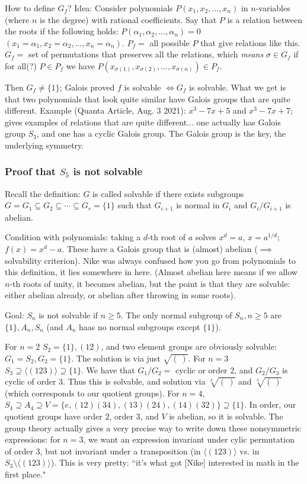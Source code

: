 \documentclass{article}
\theoremstyle{plain}
\theoremstyle{remark}
\begin{document}
How to define $G_f$?
Idea: Consider polynomials $P(x_1,x_2,\dots,x_n)$ in $n$-variables
(where $n$ is the degree) with rational coefficients.
Say that $P$ is a relation between the roots if the following holds:
$P(\alpha_1,\alpha_2,\dots,\alpha_n) = 0$ $(x_1=\alpha_1,x_2=\alpha_2,\dots,x_n=\alpha_n)$.
$P_f = $ all possible $P$ that give relations like this.
$G_f = $ set of permutations that preserves all the relations,
which \emph{means} $\sigma \in G_f$ if for all(?) $P \in P_f$ we have
$P(x_{\sigma(1)},x_{\sigma(2)},\dots,x_{\sigma(n)}) \in P_f$.

Then $G_f \neq \{1\}$; Galois proved $f$ is solvable $\iff G_f$ is solvable.
What we get is that two polynomials that look quite similar have
Galois groups that are quite different.
Example (Quanta Article, Aug. 3 2021): $x^3 - 7x + 5$ and $x^3 - 7x + 7$;
gives examples of relations that are quite different...
one actually has Galois group $S_3$, and one has a cyclic Galois group.
The Galois group is the key, the underlying symmetry.

\subsubsection{Proof that $S_5$ is not solvable}
Recall the definition: $G$ is called solvable if there exists subgroups
$G = G_1 \subseteq G_2 \subseteq \cdots \subseteq G_r = \{1\}$
such that $G_{i+1}$ is normal in $G_i$ and $G_i/G_{i+1}$ is abelian.

Condition with polynomials: taking a $d$-th root of $a$ solves $x^d = a$, $x = a^{1/d}$; $f(x) = x^d - a$.
These have a Galois group that is (almost) abelian ($\implies$ solvability criterion).
Nike was always confused how you go from polynomials to this definition,
it lies somewhere in here.
(Almost abelian here means if we allow $n$-th roots of unity, it becomes abelian,
but the point is that they are solvable:
either abelian already, or abelian after throwing in some roots).

Goal: $S_n$ is not solvable if $n \geq 5$.
The only normal subgroup of $S_n, n \geq 5$ are $\{1\}, A_n, S_n$
(and $A_n$ haas no normal subgroups except $\{1\}$).

For $n=2$ $S_2 = \{1\}, (12)$, and two element groups are obviously solvable:
$G_1 = S_2, G_2 = \{1\}$.
The solution is via just $\sqrt{(~)}$.
For $n=3$ $S_3 \supseteq \langle (123)\rangle \supseteq \{1\}$.
We have that $G_1/G_2 = $ cyclic or order $2$,
and $G_2/G_3$ is cyclic of order $3$.
Thus this is solvable,
and solution via $\sqrt[2]{(~)}$ and $\sqrt[3]{(~)}$
(which corresponds to our quotient groups).
For $n=4$, $S_4 \supseteq A_4 \supseteq V = \{e, (12)(34), (13)(24), (14)(32)\} \supseteq \{1\}$.
In order, our quotient groups have order $2$, order $3$, and $V$ is abelian,
so it is solvable.
The group theory actually gives a very precise way to write down
these nonsymmetric expressions:
for $n=3$, we want an expression invariant under cylic permutation of order $3$,
but not invariant under a transposition (in $\langle (123)\rangle$
vs. in $S_3\setminus \langle (123)\rangle$).
This is very pretty: ``it's what got [Nike] interested in math in the first place."
\end{document}
